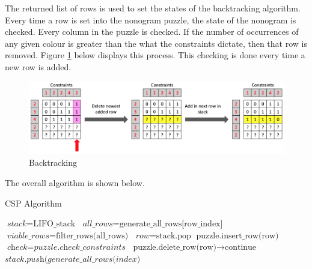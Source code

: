 \documentclass{svproc}
\begin{document}
The returned list of rows is used to set the states of the backtracking algorithm. Every time a row is set into the nonogram puzzle, the state of the nonogram is checked. Every column in the puzzle is checked. If the number of occurrences of any given colour is greater than the what the constraints dictate, then that row is removed. Figure \ref{fig:Backtrack} below displays this process. This checking is done every time a new row is added.

\begin{figure}[h]
    \centering
    \includegraphics[scale=0.36]{Backtracking.png}
    \caption{Backtracking}
    \label{fig:Backtrack}
\end{figure}

The overall algorithm is shown below.

\begin{algorithm}
    \caption{CSP Algorithm}\label{euclid}
    \begin{algorithmic}[2]
        \State $\textit{stack} = \text{LIFO\_stack}$
        \State $\textit{all\_rows} = \text{generate\_all\_rows[row\_index]}$
        \State $\textit{viable\_rows} = \text{filter\_rows(all\_rows)}$
        \State $\textit{row} = \text{stack.pop}$
        \State $\text{puzzle.insert\_row(row)}$
        \State $\textit{check} = \textit{puzzle.check\_constraints}$
        \State $\text{puzzle.delete\_row(row)} \to \text{continue}$
        \EndIf
        \State $\textit{stack.push(generate\_all\_rows(index)}$
        \EndWhile
        \EndWhile
    \end{algorithmic}
\end{algorithm}
\end{document}
